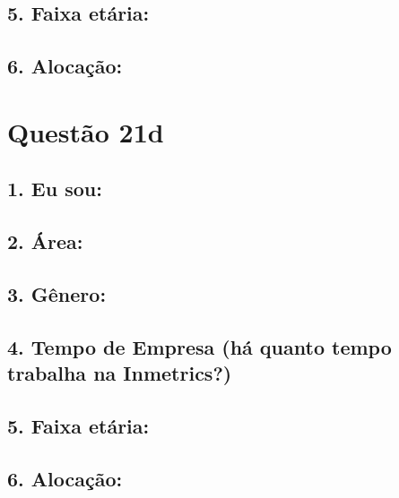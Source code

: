 \documentclass[]{book}
\begin{document}
\hypertarget{faixa-etaria-63}{%
\subsection{5. Faixa etária:}\label{faixa-etaria-63}}

\hypertarget{alocacao-63}{%
\subsection{6. Alocação:}\label{alocacao-63}}

\hypertarget{questao-21d}{%
\section{Questão 21d}\label{questao-21d}}

\hypertarget{eu-sou-64}{%
\subsection{1. Eu sou:}\label{eu-sou-64}}

\hypertarget{area-64}{%
\subsection{2. Área:}\label{area-64}}

\hypertarget{genero-64}{%
\subsection{3. Gênero:}\label{genero-64}}

\hypertarget{tempo-de-empresa-ha-quanto-tempo-trabalha-na-inmetrics-64}{%
\subsection{4. Tempo de Empresa (há quanto tempo trabalha na Inmetrics?)}\label{tempo-de-empresa-ha-quanto-tempo-trabalha-na-inmetrics-64}}

\hypertarget{faixa-etaria-64}{%
\subsection{5. Faixa etária:}\label{faixa-etaria-64}}

\hypertarget{alocacao-64}{%
\subsection{6. Alocação:}\label{alocacao-64}}
\end{document}
